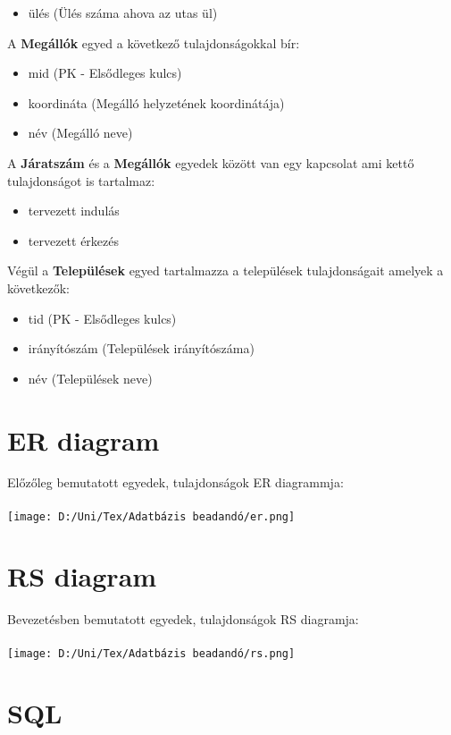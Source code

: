 \documentclass[12pt]{article}
\begin{document}
\begin{itemize}
\item ülés (Ülés száma ahova az utas ül)
\end{itemize}
A \textbf{Megállók} egyed a következő tulajdonságokkal bír:
\begin{itemize}
\item mid (PK - Elsődleges kulcs)
\item koordináta (Megálló helyzetének koordinátája)
\item név (Megálló neve)
\end{itemize}
A \textbf{Járatszám} és a \textbf{Megállók} egyedek között van egy kapcsolat ami kettő tulajdonságot is tartalmaz:
\begin{itemize}
\item tervezett indulás
\item tervezett érkezés
\end{itemize}
Végül a \textbf{Települések} egyed tartalmazza a települések tulajdonságait amelyek a következők:
\begin{itemize}
\item tid (PK - Elsődleges kulcs)
\item irányítószám (Települések irányítószáma)
\item név (Települések neve)
\end{itemize}
\newpage
\section{ER diagram}
Előzőleg bemutatott egyedek, tulajdonságok ER diagrammja:\\
\\
\texttt{[image: D:/Uni/Tex/Adatbázis beadandó/er.png]}
\newpage
\section{RS diagram}
Bevezetésben bemutatott egyedek, tulajdonságok RS diagramja:\\
\\
\texttt{[image: D:/Uni/Tex/Adatbázis beadandó/rs.png]}
\newpage
\section{SQL}
\end{document}
